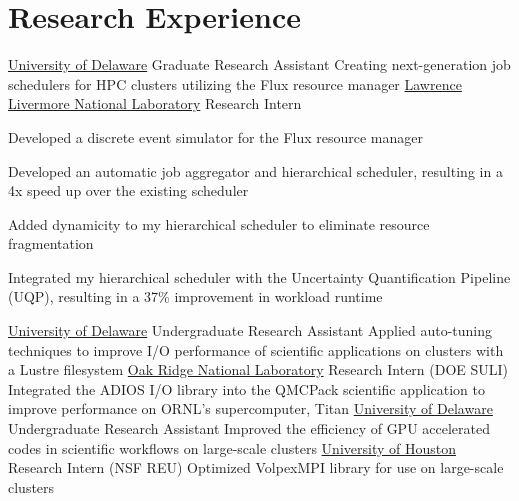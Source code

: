 \section{Research Experience}
		{\href{https://www.udel.edu}{University of Delaware}}
		{Graduate Research Assistant}
		{}{}
		{Creating next-generation job schedulers for HPC clusters utilizing the Flux resource manager}
		{\href{https://www.llnl.gov}{Lawrence Livermore National Laboratory}}
		{Research Intern}
		{}{}
		{
          \begin{description}[labelwidth=0.8cm,leftmargin=!]
          \item[2014:] Developed a discrete event simulator for the Flux resource manager
          \item[2015:] Developed an automatic job aggregator and hierarchical scheduler, resulting in a 4x speed up over the existing scheduler
          \item[2016:] Added dynamicity to my hierarchical scheduler to eliminate resource fragmentation
          \item[2017:] Integrated my hierarchical scheduler with the Uncertainty Quantification Pipeline (UQP), resulting in a 37\% improvement in workload runtime \label{last-item}
          \end{description}
        }
		{\href{http://www.udel.edu}{University of Delaware}}
		{Undergraduate Research Assistant}
		{}{}
		{Applied auto-tuning techniques to improve I/O performance of scientific applications on clusters with a Lustre filesystem}
		{\href{https://www.ornl.gov}{Oak Ridge National Laboratory}}
		{Research Intern (DOE SULI)}
		{}{}
		{Integrated the ADIOS I/O library into the QMCPack scientific application to improve performance on ORNL’s supercomputer, Titan}
		{\href{http://www.udel.edu}{University of Delaware}}
		{Undergraduate Research Assistant}
		{}{}
		{Improved the efficiency of GPU accelerated codes in scientific workflows on large-scale clusters}
		{\href{http://uh.edu}{University of Houston}}
		{Research Intern (NSF REU)}
		{}{}
		{Optimized VolpexMPI library for use on large-scale clusters}

